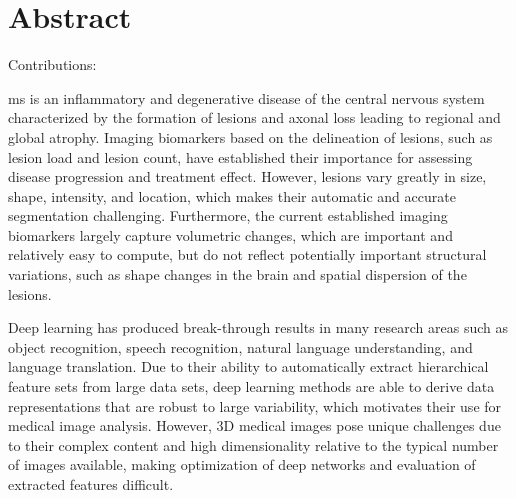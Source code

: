 \chapter*{Abstract}




Contributions:

\Gls{ms} is an inflammatory and degenerative disease of the central nervous
system characterized by the formation of lesions and axonal loss leading to
regional and global atrophy. Imaging biomarkers based on the delineation of
lesions, such as lesion load and lesion count, have established their importance
for assessing disease progression and treatment effect. However, lesions vary
greatly in size, shape, intensity, and location, which makes their automatic and
accurate segmentation challenging. Furthermore, the current established imaging
biomarkers largely capture volumetric changes, which are important and
relatively easy to compute, but do not reflect potentially important structural
variations, such as shape changes in the brain and spatial dispersion of the
lesions.

Deep learning has produced break-through results in many research areas such as
object recognition, speech recognition, natural language understanding, and
language translation. Due to their ability to automatically extract hierarchical
feature sets from large data sets, deep learning methods are able to derive data
representations that are robust to large variability, which motivates their use
for medical image analysis. However, 3D medical images pose unique challenges
due to their complex content and high dimensionality relative to the typical
number of images available, making optimization of deep networks and evaluation
of extracted features difficult.

